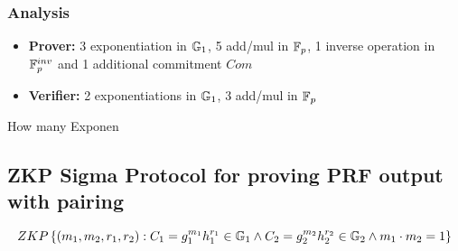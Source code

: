 \subsubsection{Analysis}

\begin{itemize}
    \item \textbf{Prover:} 3 exponentiation in $\mathbb{G}_1$, 5 add/mul in $\mathbb{F}_p$, 1 inverse operation in $\mathbb{F}_p^{inv}$ and 1 additional commitment $Com$
    \item \textbf{Verifier:} 2 exponentiations in $\mathbb{G}_1$, 3 add/mul in $\mathbb{F}_p$
\end{itemize}How many Exponen



\subsection{ZKP Sigma Protocol for proving PRF output with pairing}

\[
ZKP
    \left\{ 
    (m_1, m_2, r_1, r_2): C_1 = g_1^{m_1}h_1^{r_1} \in \mathbb{G}_1 \wedge C_2 = g_2^{m_2}h_2^{r_2} \in \mathbb{G}_2 \wedge m_1 \cdot m_2 = 1
    \right\}
\]


